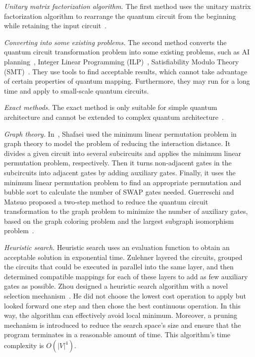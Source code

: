 \documentclass[runningheads]{llncs}
\begin{document}
\emph{Unitary matrix factorization algorithm.} The first method uses the unitary matrix factorization algorithm to rearrange the quantum circuit from the beginning while retaining the input circuit~\cite{2019CNOT,2019Quantum}.

\emph{Converting into some existing problems.} The second method converts the quantum circuit transformation problem into some existing problems, such as AI planning~\cite{2017Temporal,2018Integer}, Integer Linear Programming (ILP)~\cite{2019Almeida}, Satisfiability Modulo Theory (SMT)~\cite{2019Murali}. They use tools to find acceptable results, which cannot take advantage of certain properties of quantum mapping. Furthermore, they may run for a long time and apply to small-scale quantum circuits.

\emph{Exact methods.} 
The exact method is only suitable for simple quantum architecture and cannot be extended to complex quantum architecture~\cite{2018QubitSiraichi}.

\emph{Graph theory.} 
In~\cite{Shafaei2013}, Shafaei used the minimum linear permutation problem in graph theory to model the problem of reducing the interaction distance. It divides a given circuit into several subcircuits and applies the minimum linear permutation problem, respectively. Then it turns non-adjacent gates in the subcircuits into adjacent gates by adding auxiliary gates. Finally, it uses the minimum linear permutation problem to find an appropriate permutation and bubble sort to calculate the number of SWAP gates needed. Guerreschi and Matsuo proposed a two-step method to reduce the quantum circuit transformation to the graph problem to minimize the number of auxiliary gates, based on the graph coloring problem and the largest subgraph isomorphism problem~\cite{Guerreschi2018,Matsuo2019}.

\emph{Heuristic search.}
Heuristic search uses an evaluation function to obtain an acceptable solution in exponential time. Zulehner layered the circuits, grouped the circuits that could be executed in parallel into the same layer, and then determined compatible mappings for each of these layers to add as few auxiliary gates as possible. Zhou designed a heuristic search algorithm with a novel selection mechanism~\cite{Xiangzhen2020}. He did not choose the lowest cost operation to apply but looked forward one step and then chose the best continuous operation. In this way, the algorithm can effectively avoid local minimum. Moreover, a pruning mechanism is introduced to reduce the search space's size and ensure that the program terminates in a reasonable amount of time. This algorithm's time complexity is $O(|V|^{4})$.
\end{document}
